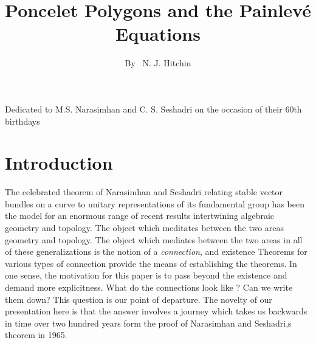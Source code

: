 \title{Poncelet Polygons and the Painlev\'e Equations}

\author{By~ N. J. Hitchin}

\date{}
\maketitle

\begin{center}
Dedicated to M.S. Narasimhan and C. S. Seshadri on the occasion of their 60th birthdays
\end{center}

\section{Introduction}\label{art7-sec-1}
The celebrated theorem of Narasimhan and Seshadri \cite{art7-key13} relating stable vector bundles on a curve to unitary representations of its fundamental group has been the model for an enormous range of recent results intertwining algebraic geometry and topology. The object which meditates between the two areas geometry and topology. The object which mediates between the two areas in all of these generalizations is the notion of a \textit{connection}, and existence Theorems for various types of connection provide the means of establishing the theorems. In one sense, the motivation for this paper is to pass beyond the existence and demand more explicitness. What do the connections look like ? Can we write them down? This question is our point of departure. The novelty of our presentation here is that the answer involves a journey which takes us backwards in time over two hundred years form the proof of Narasimhan and Seshadri,s theorem in 1965.

